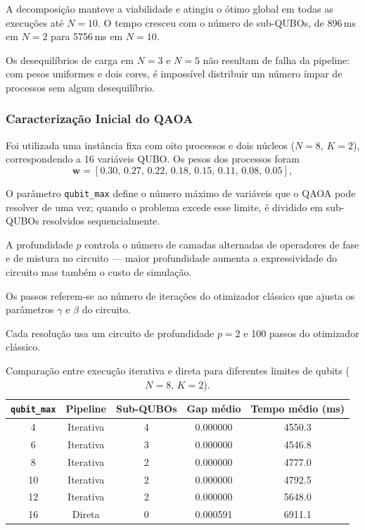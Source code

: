 A decomposição manteve a viabilidade e atingiu o
ótimo global em todas as execuções até $N=10$. O tempo cresceu com o número de
sub-QUBOs, de 896\,ms em $N=2$ para 5756\,ms em $N=10$.

Os desequilíbrios de carga em $N=3$ e $N=5$ não resultam de falha da pipeline: com pesos
uniformes e dois cores, é impossível distribuir um número ímpar de processos sem algum
desequilíbrio.

\subsubsection{Caracterização Inicial do QAOA}
\label{subsec:caracterizacao-inicial-qaoa}
Foi utilizada uma instância fixa com oito processos e dois núcleos
($N=8$, $K=2$), correspondendo a 16 variáveis QUBO. Os pesos dos processos foram
$$
\mathbf{w} = [0.30,\,0.27,\,0.22,\,0.18,\,0.15,\,0.11,\,0.08,\,0.05],
$$

O parâmetro \texttt{qubit\_max} define o número máximo de variáveis que o QAOA pode 
resolver de uma vez; quando o problema excede esse limite, é dividido em sub-QUBOs 
resolvidos sequencialmente. 

A profundidade $p$ controla o número de camadas alternadas 
de operadores de fase e de mistura no circuito --- maior profundidade aumenta a 
expressividade do circuito mas também o custo de simulação. 

Os passos referem-se ao 
número de iterações do otimizador clássico que ajusta os parâmetros $\gamma$ e $\beta$ 
do circuito.

Cada resolução usa um
circuito de profundidade $p=2$ e 100 passos do otimizador clássico.

\begin{table}[H]
\centering
\begin{tabular}{|c|c|c|c|c|}
\hline
\textbf{\texttt{qubit\_max}} & \textbf{Pipeline} & \textbf{Sub-QUBOs} & \textbf{Gap médio} & \textbf{Tempo médio (ms)} \\
\hline
4  & Iterativa & 4 & 0.000000 & 4550.3 \\
6  & Iterativa & 3 & 0.000000 & 4546.8 \\
8  & Iterativa & 2 & 0.000000 & 4777.0 \\
10 & Iterativa & 2 & 0.000000 & 4792.5 \\
12 & Iterativa & 2 & 0.000000 & 5648.0 \\
16 & Direta    & 0 & 0.000591 & 6911.1 \\
\hline
\end{tabular}
\caption{Comparação entre execução iterativa e direta para diferentes limites de qubits ($N=8$, $K=2$).}
\label{tab:resultados-qubitmax}
\end{table}

